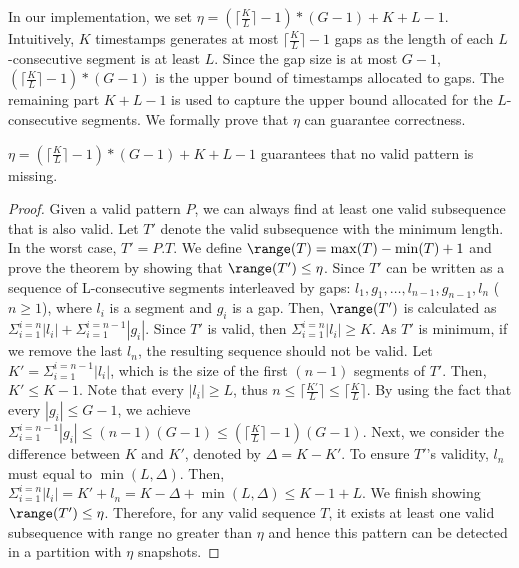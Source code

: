 In our implementation, we set $\eta = (\lceil \frac{K}{L} \rceil - 1)*(G-1)+K+L-1$. Intuitively, $K$ timestamps generates at most $\lceil \frac{K}{L} \rceil - 1$ gaps as the length of each $L$-consecutive segment is at least $L$. Since the gap size is at most $G-1$, $(\lceil \frac{K}{L} \rceil - 1)*(G-1)$ is the upper bound of timestamps allocated to gaps. The remaining part $K+L-1$ is used to capture the upper bound allocated for the $L$-consecutive segments. We formally prove that $\eta$ can guarantee correctness.


\begin{theorem}
\label{THM:RP_ETA}
$\eta = (\lceil \frac{K}{L} \rceil - 1)*(G-1)+K+L-1$ guarantees that no valid pattern is missing.
\end{theorem}
\begin{proof}
Given a valid pattern $P$, we can always find at least one valid subsequence that is also valid. Let $T'$ denote the valid subsequence with the minimum length. In the worst case, $T'=P.T$. We define $\range(T)=\max(T) - \min(T) +1$ and prove the theorem by showing that $\range(T') \leq \eta$.
Since $T'$ can be written as a sequence of L-consecutive segments interleaved by gaps: $l_1,g_1,\ldots,l_{n-1},g_{n-1},l_n$ ($n \geq 1$),
where $l_i$ is a segment and $g_i$ is a gap. Then, $\range(T')$
is calculated as $\Sigma_{i=1}^{i=n}|l_i| + \Sigma_{i=1}^{i=n-1} |g_i|$. Since $T'$
is valid, then $\Sigma_{i=1}^{i=n}|l_i| \geq K$. As $T'$ is minimum, if we remove the 
last $l_n$, the resulting sequence should not be valid. Let $K' = \Sigma_{i=1}^{i=n-1}|l_i|$, which
is the size of the first $(n-1)$ segments of $T'$. Then, $K' \leq K-1$.
Note that every $|l_i| \geq L$, thus $n \leq \lceil \frac{K'}{L} \rceil \leq \lceil \frac{K}{L} \rceil $. By
using the fact that every $|g_i| \leq G-1$, we achieve $\Sigma_{i=1}^{i=n-1} |g_i| \leq (n-1)(G-1)
\leq (\lceil \frac{K}{L} \rceil -1)(G-1)$. Next, we consider the difference between $K$ and $K'$, denoted by
$\Delta = K- K'$. To ensure $T'$'s validity, $l_n$ must equal to $\min(L, \Delta)$.
Then, $\Sigma_{i=1}^{i=n}|l_i| = K' + l_n = K - \Delta + \min(L, \Delta) \leq K - 1 + L$. We finish showing $\range(T') \leq \eta$.  Therefore, for any valid sequence $T$, it exists at least one valid subsequence with range no greater than $\eta$ and hence this pattern can be detected in a partition with $\eta$ snapshots.
\end{proof}

